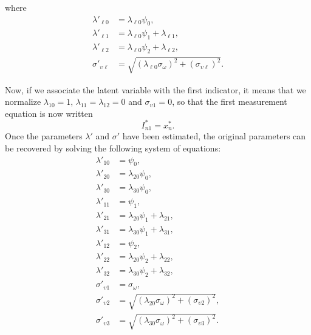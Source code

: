 \documentclass[12pt,a4paper]{article}
\begin{document}
where
\begin{align*}
  \lambda'_{\ell 0} &= \lambda_{\ell 0}  \psi_{0}, \\
  \lambda'_{\ell 1} &=\lambda_{\ell 0}\psi_1 +  \lambda_{\ell 1},\\
  \lambda'_{\ell 2} &=\lambda_{\ell 0}\psi_2 +  \lambda_{\ell 2}, \\
  \sigma'_{\upsilon \ell} &= \sqrt{(\lambda_{\ell 0}\sigma_\omega )^2 + (\sigma_{\upsilon \ell})^2}.
\end{align*}

Now, if we associate the latent variable with the first indicator, it means that we normalize $\lambda_{10}=1$, $\lambda_{11}=\lambda_{12}=0$ and $\sigma_{\upsilon 1} = 0$, so that the first measurement equation is  now written
\[
I^*_{n1} = x_{n}^*.
\]
Once the parameters $\lambda'$ and $\sigma'$ have been estimated, the original parameters can be recovered by solving the following system of equations:
\begin{align*}
  \lambda'_{1 0} &=  \psi_{0}, \\
  \lambda'_{2 0} &= \lambda_{2 0}  \psi_{0}, \\
  \lambda'_{3 0} &= \lambda_{3 0}  \psi_{0}, \\
  \lambda'_{1 1} &=\psi_1,\\
  \lambda'_{2 1} &=\lambda_{2 0}\psi_1 +  \lambda_{2 1},\\
  \lambda'_{3 1} &=\lambda_{3 0}\psi_1 +  \lambda_{3 1},\\
  \lambda'_{1 2} &=\psi_2, \\
  \lambda'_{2 2} &=\lambda_{2 0}\psi_2 +  \lambda_{2 2}, \\
  \lambda'_{3 2} &=\lambda_{3 0}\psi_2 +  \lambda_{3 2}, \\
  \sigma'_{\upsilon 1} &= \sigma_\omega, \\
  \sigma'_{\upsilon 2} &= \sqrt{(\lambda_{2 0}\sigma_\omega )^2 + (\sigma_{\upsilon 2})^2},\\
  \sigma'_{\upsilon 3} &= \sqrt{(\lambda_{3 0}\sigma_\omega )^2 + (\sigma_{\upsilon 3})^2}.
\end{align*}
\end{document}
